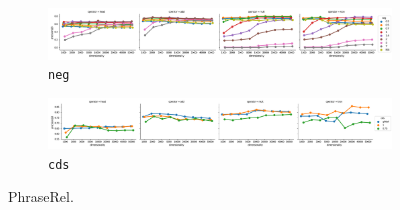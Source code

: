 \begin{figure}
  \centering

  \begin{subfigure}[t]{\textwidth}
    \includegraphics[width=1.1\textwidth]{supplement/figures/phraserel-interaction-neg}

  \caption{\texttt{neg}}
  \label{fig:phraserel-neg}
  \end{subfigure}

  \begin{subfigure}[t]{\textwidth}
    \includegraphics[width=1.1\textwidth]{supplement/figures/phraserel-interaction-cds}

  \caption{\texttt{cds}}
  \label{fig:phraserel-cds}
  \end{subfigure}

  \caption{PhraseRel.}
\end{figure}
